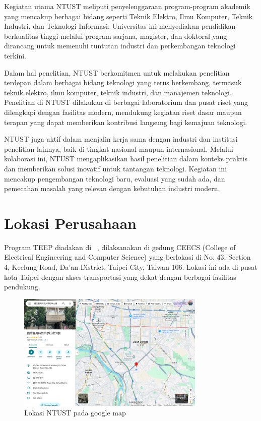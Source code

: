 Kegiatan utama NTUST meliputi penyelenggaraan program-program akademik yang mencakup berbagai bidang seperti Teknik Elektro, Ilmu Komputer, Teknik Industri, dan Teknologi Informasi. Universitas ini menyediakan pendidikan berkualitas tinggi melalui program sarjana, magister, dan doktoral yang dirancang untuk memenuhi tuntutan industri dan perkembangan teknologi terkini.

Dalam hal penelitian, NTUST berkomitmen untuk melakukan penelitian terdepan dalam berbagai bidang teknologi yang terus berkembang, termasuk teknik elektro, ilmu komputer, teknik industri, dan manajemen teknologi. Penelitian di NTUST dilakukan di berbagai laboratorium dan pusat riset yang dilengkapi dengan fasilitas modern, mendukung kegiatan riset dasar maupun terapan yang dapat memberikan kontribusi langsung bagi kemajuan teknologi.

NTUST juga aktif dalam menjalin kerja sama dengan industri dan institusi penelitian lainnya, baik di tingkat nasional maupun internasional. Melalui kolaborasi ini, NTUST mengaplikasikan hasil penelitian dalam konteks praktis dan memberikan solusi inovatif untuk tantangan teknologi. Kegiatan ini mencakup pengembangan teknologi baru, evaluasi yang sudah ada, dan pemecahan masalah yang relevan dengan kebutuhan industri modern.

\section{Lokasi Perusahaan}

Program TEEP diadakan di \namaUniv \ , dilaksanakan di gedung CEECS (College of Electrical Engineering and Computer Science) yang berlokasi di No. 43, Section 4, Keelung Road, Da'an District, Taipei City, Taiwan 106. Lokasi ini ada di pusat kota Taipei dengan akses transportasi yang dekat dengan berbagai fasilitas pendukung.


\begin{figure}[H]
    \centering
    \includegraphics[width=0.8\textwidth]{assets/pics/lokasintust.png}
    \caption{Lokasi NTUST pada google map}
    \label{fig:loc}
\end{figure}

